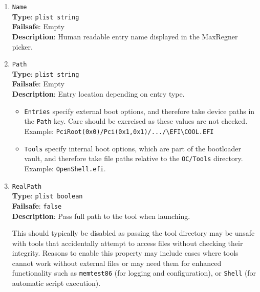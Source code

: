 \documentclass[]{article}
\providecommand{\tightlist}{%
  \setlength{\itemsep}{0pt}\setlength{\parskip}{0pt}}
\begin{document}
\begin{enumerate}
  This disables all of the NVRAM protections provided by
  \texttt{OpenRuntime.efi}, during the time a tool is in use. It should
  normally be avoided, but may be required for instance if a tool needs
  to access NVRAM directly without the redirections put in place by
  \texttt{RequestBootVarRouting}.

  \emph{Note}: This option is only valid for \texttt{Tools} and cannot be
  specified for \texttt{Entries} (is always \texttt{false}).

\item
  \texttt{Name}\\
  \textbf{Type}: \texttt{plist\ string}\\
  \textbf{Failsafe}: Empty\\
  \textbf{Description}: Human readable entry name displayed in the MaxRegner picker.

\item
  \texttt{Path}\\
  \textbf{Type}: \texttt{plist\ string}\\
  \textbf{Failsafe}: Empty\\
  \textbf{Description}: Entry location depending on entry type.

  \begin{itemize}
  \tightlist
  \item \texttt{Entries} specify external boot options, and therefore take device
  paths in the \texttt{Path} key. Care should be exercised as these values are not checked.
  Example: \texttt{PciRoot(0x0)/Pci(0x1,0x1)/.../\textbackslash EFI\textbackslash COOL.EFI}
  \item \texttt{Tools} specify internal boot options, which are part of the bootloader
  vault, and therefore take file paths relative to the \texttt{OC/Tools} directory.
  Example: \texttt{OpenShell.efi}.
  \end{itemize}

\item
  \texttt{RealPath}\\
  \textbf{Type}: \texttt{plist\ boolean}\\
  \textbf{Failsafe}: \texttt{false}\\
  \textbf{Description}: Pass full path to the tool when launching.

  This should typically be disabled as passing the tool directory may be unsafe with
  tools that accidentally attempt to access files without checking their integrity.
  Reasons to enable this property may include cases where tools cannot work
  without external files or may need them for enhanced functionality such as
  \texttt{memtest86} (for logging and configuration), or \texttt{Shell} (for
  automatic script execution).


\end{enumerate}
\end{document}
